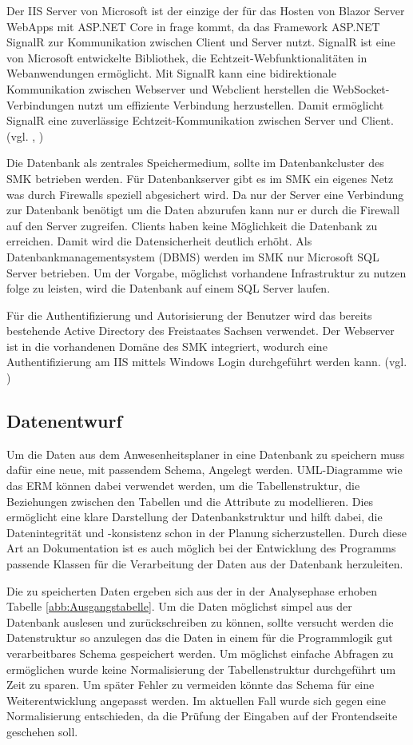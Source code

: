 Der IIS Server von Microsoft ist der einzige der für das Hosten von Blazor Server WebApps mit ASP.NET Core in frage kommt, da das Framework ASP.NET SignalR zur Kommunikation zwischen Client und Server nutzt. SignalR ist eine von Microsoft entwickelte Bibliothek, die Echtzeit-Webfunktionalitäten in Webanwendungen ermöglicht. Mit SignalR kann eine bidirektionale Kommunikation zwischen Webserver und Webclient herstellen die WebSocket-Verbindungen nutzt um effiziente Verbindung herzustellen. Damit ermöglicht SignalR eine zuverlässige Echtzeit-Kommunikation zwischen Server und Client. (vgl. \cite{SignalR}, \cite{SignalRPlatf})

Die Datenbank als zentrales Speichermedium, sollte im Datenbankcluster des SMK betrieben werden. Für Datenbankserver gibt es im SMK ein eigenes Netz was durch Firewalls speziell abgesichert wird. Da nur der Server eine Verbindung zur Datenbank benötigt um die Daten abzurufen kann nur er durch die Firewall auf den Server zugreifen. Clients haben keine Möglichkeit die Datenbank zu erreichen. Damit wird die Datensicherheit deutlich erhöht. Als Datenbankmanagementsystem (DBMS) werden im SMK nur Microsoft SQL Server betrieben. Um der Vorgabe, möglichst vorhandene Infrastruktur zu nutzen folge zu leisten, wird die Datenbank auf einem SQL Server laufen.

Für die Authentifizierung und Autorisierung der Benutzer wird das bereits bestehende Active Directory des Freistaates Sachsen verwendet. Der Webserver ist in die vorhandenen Domäne des SMK integriert, wodurch eine Authentifizierung am IIS mittels Windows Login durchgeführt werden kann. (vgl. \cite{IIS})

\subsection{Datenentwurf}
\label{sec:Datenentwurf}
Um die Daten aus dem Anwesenheitsplaner in eine Datenbank zu speichern muss dafür eine neue, mit passendem Schema, Angelegt werden. UML-Diagramme wie das ERM können dabei verwendet werden, um die Tabellenstruktur, die Beziehungen zwischen den Tabellen und die Attribute zu modellieren. Dies ermöglicht eine klare Darstellung der Datenbankstruktur und hilft dabei, die Datenintegrität und -konsistenz schon in der Planung sicherzustellen. Durch diese Art an Dokumentation ist es auch möglich bei der Entwicklung des Programms passende Klassen für die Verarbeitung der Daten aus der Datenbank herzuleiten.

Die zu speicherten Daten ergeben sich aus der in der Analysephase erhoben Tabelle \ref{abb:Ausgangstabelle}. Um die Daten möglichst simpel aus der Datenbank auslesen und zurückschreiben zu können, sollte versucht werden die Datenstruktur so anzulegen das die Daten in einem für die Programmlogik gut verarbeitbares Schema gespeichert werden. Um möglichst einfache Abfragen zu ermöglichen wurde keine Normalisierung der Tabellenstruktur durchgeführt um Zeit zu sparen. Um später Fehler zu vermeiden könnte das Schema für eine Weiterentwicklung angepasst werden. Im aktuellen Fall wurde sich gegen eine Normalisierung entschieden, da die Prüfung der Eingaben auf der Frontendseite geschehen soll.

